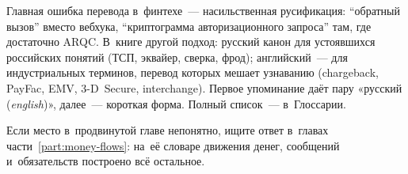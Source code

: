 Главная ошибка перевода в~финтехе~--- насильственная русификация:
\enquote{обратный вызов} вместо вебхука, \enquote{криптограмма авторизационного
запроса} там, где достаточно ARQC. В~книге другой подход: русский канон
для устоявшихся российских понятий (ТСП, эквайер, сверка, фрод); английский~---
для индустриальных терминов, перевод которых мешает узнаванию (chargeback,
PayFac, EMV, 3-D~Secure, interchange). Первое упоминание даёт пару
«русский (\textit{english})», далее~--- короткая форма. Полный список~---
в~Глоссарии.

Если место в~продвинутой главе непонятно, ищите ответ в~главах
части~\ref{part:money-flows}: на~её словаре движения денег, сообщений
и~обязательств построено всё остальное.
